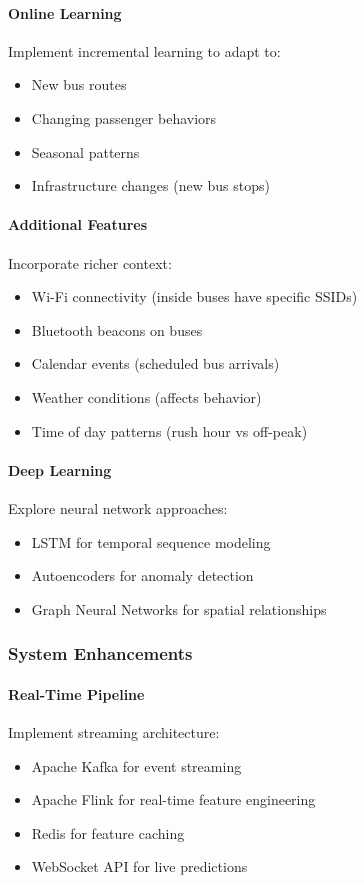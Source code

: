 \paragraph{Online Learning}
Implement incremental learning to adapt to:
\begin{itemize}
    \item New bus routes
    \item Changing passenger behaviors
    \item Seasonal patterns
    \item Infrastructure changes (new bus stops)
\end{itemize}

\paragraph{Additional Features}
Incorporate richer context:
\begin{itemize}
    \item Wi-Fi connectivity (inside buses have specific SSIDs)
    \item Bluetooth beacons on buses
    \item Calendar events (scheduled bus arrivals)
    \item Weather conditions (affects behavior)
    \item Time of day patterns (rush hour vs off-peak)
\end{itemize}

\paragraph{Deep Learning}
Explore neural network approaches:
\begin{itemize}
    \item LSTM for temporal sequence modeling
    \item Autoencoders for anomaly detection
    \item Graph Neural Networks for spatial relationships
\end{itemize}

\subsubsection{System Enhancements}

\paragraph{Real-Time Pipeline}
Implement streaming architecture:
\begin{itemize}
    \item Apache Kafka for event streaming
    \item Apache Flink for real-time feature engineering
    \item Redis for feature caching
    \item WebSocket API for live predictions
\end{itemize}

